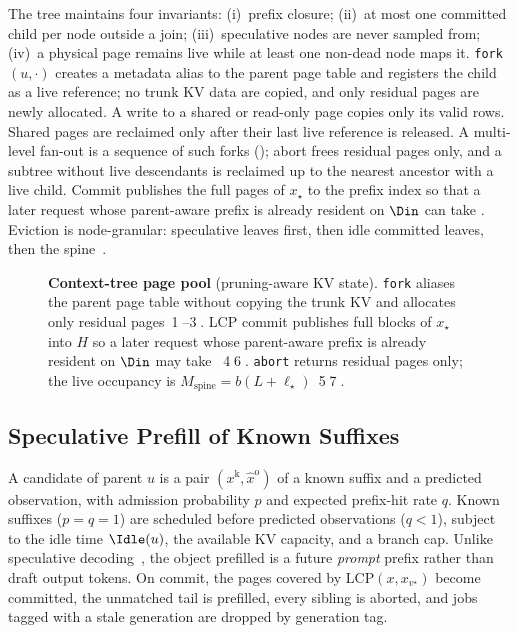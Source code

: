 The tree maintains four invariants: (i)~prefix closure; (ii)~at most one committed child per node outside a join; (iii)~speculative nodes are never sampled from; (iv)~a physical page remains live while at least one non-dead node maps it.
\texttt{fork}$(u,\cdot)$ creates a metadata alias to the parent page table and registers the child as a live reference; no trunk KV data are copied, and only residual pages are newly allocated.
A write to a shared or read-only page copies only its valid rows.
Shared pages are reclaimed only after their last live reference is released.
A multi-level fan-out is a sequence of such forks (); abort frees residual pages only, and a subtree without live descendants is reclaimed up to the nearest ancestor with a live child.
Commit publishes the full pages of $x_\star$ to the prefix index so that a later request whose parent-aware prefix is already resident on $\Din$ can take \Hit.
Eviction is node-granular: speculative leaves first, then idle committed leaves, then the spine~\cite{continuum,mori}.

\begin{figure}[t]
\centering
\resizebox{\textwidth}{!}{}
\caption{\textbf{Context-tree page pool} (pruning-aware KV state).
\texttt{fork} aliases the parent page table without copying the trunk KV and allocates only residual pages~\textcircled{1}--\textcircled{3}.
LCP commit publishes full blocks of $x_\star$ into $H$ so a later request whose parent-aware prefix is already resident on $\Din$ may take \Hit~\textcircled{4}\textcircled{6}.
\texttt{abort} returns residual pages only; the live occupancy is $M_{\mathrm{spine}}{=}b(L{+}\ell_\star)$~\textcircled{5}\textcircled{7}.}
\label{fig:pool}
\end{figure}

\subsection{Speculative Prefill of Known Suffixes}
\label{sec:speculate}
A candidate of parent $u$ is a pair $(x^{\mathrm{k}},\hat{x}^{\mathrm{o}})$ of a known suffix and a predicted observation, with admission probability $p$ and expected prefix-hit rate $q$.
Known suffixes ($p{=}q{=}1$) are scheduled before predicted observations ($q{<}1$), subject to the idle time $\Idle(u)$, the available KV capacity, and a branch cap.
Unlike speculative decoding~\cite{speculative,medusa}, the object prefilled is a future \emph{prompt} prefix rather than draft output tokens.
On commit, the pages covered by $\mathrm{LCP}(x,x_{v^\star})$ become committed, the unmatched tail is prefilled, every sibling is aborted, and jobs tagged with a stale generation are dropped by generation tag.

